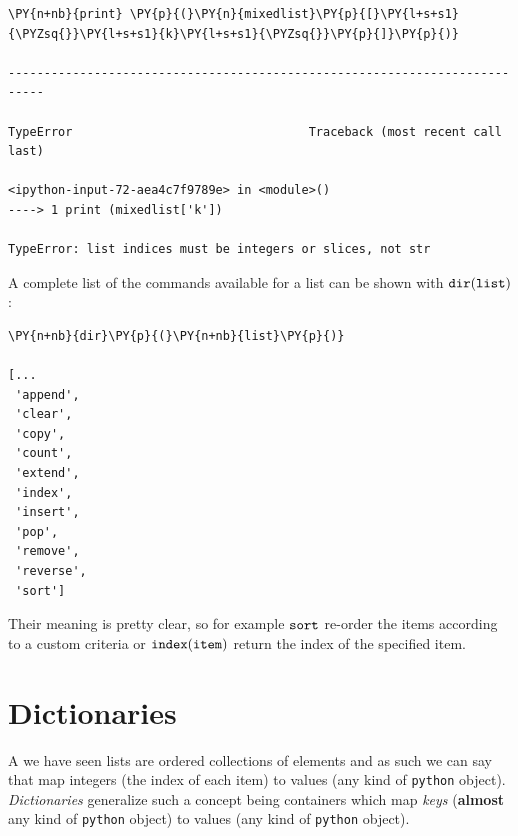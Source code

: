 \begin{tcolorbox}[breakable, size=fbox, boxrule=1pt, pad at break*=1mm, colback=cellbackground, colframe=cellborder]
\begin{Verbatim}[commandchars=\\\{\}]
\PY{n+nb}{print} \PY{p}{(}\PY{n}{mixedlist}\PY{p}{[}\PY{l+s+s1}{\PYZsq{}}\PY{l+s+s1}{k}\PY{l+s+s1}{\PYZsq{}}\PY{p}{]}\PY{p}{)}

---------------------------------------------------------------------------

TypeError                                 Traceback (most recent call last)

<ipython-input-72-aea4c7f9789e> in <module>()
----> 1 print (mixedlist['k'])
    
TypeError: list indices must be integers or slices, not str
\end{Verbatim}
\end{tcolorbox}

A complete list of the commands available for a list can be shown with $\tt{dir(list)}$:

\begin{tcolorbox}[breakable, size=fbox, boxrule=1pt, pad at break*=1mm,colback=cellbackground, colframe=cellborder]
\begin{Verbatim}[commandchars=\\\{\}]
\PY{n+nb}{dir}\PY{p}{(}\PY{n+nb}{list}\PY{p}{)}

[...
 'append',
 'clear',
 'copy',
 'count',
 'extend',
 'index',
 'insert',
 'pop',
 'remove',
 'reverse',
 'sort']
\end{Verbatim}
\end{tcolorbox}

Their meaning is pretty clear, so for example $\tt{sort}$ re-order the items according to a custom criteria or $\tt{index(item)}$ return the index of the specified item.

\section{Dictionaries}\label{dictionaries}

A we have seen lists are ordered collections of elements and as such we can say that map integers 
(the index of each item) to values (any kind of \texttt{python} object). 
\emph{Dictionaries} generalize such a concept being containers which map \emph{keys} 
(\textbf{almost} any kind of \texttt{python} object) to values (any kind of \texttt{python} object).

